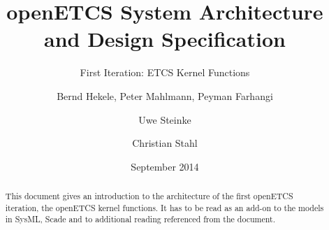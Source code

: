 \documentclass{template/openetcs_article}
\begin{document}
\frontmatter
{}


%




\title{openETCS System Architecture and Design Specification}

\subtitle{First Iteration: ETCS Kernel Functions}

\date{September 2014}



\techassessoraffil{[affiliation]}





\author{Bernd Hekele, Peter Mahlmann, Peyman Farhangi}


\author{Uwe Steinke}


\author{Christian Stahl}





\begin{abstract}
This document gives an introduction to the architecture of the first openETCS iteration, the openETCS kernel functions. It has to be read as an add-on to the models in SysML, Scade and to additional reading referenced from the document.
\end{abstract}
\end{document}
